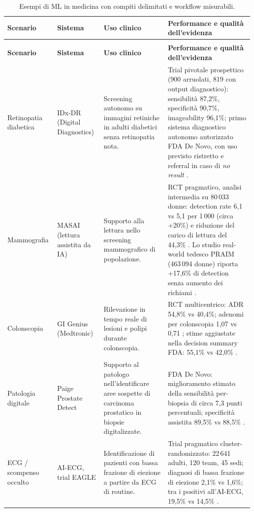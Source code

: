 \documentclass[11pt,a4paper]{article}
\begin{document}
\begin{longtable}{>{\RaggedRight}p{2.1cm} >{\RaggedRight}p{2.4cm} >{\RaggedRight}p{4.0cm} >{\RaggedRight}p{5.3cm}}
\caption{Esempi di ML in medicina con compiti delimitati e workflow misurabili.}
\label{tab:medicina}\\
\toprule
\textbf{Scenario} & \textbf{Sistema} & \textbf{Uso clinico} & \textbf{Performance e qualità dell'evidenza} \\
\midrule
\endfirsthead
\multicolumn{4}{l}{\footnotesize\itshape Tabella \ref{tab:medicina} (continua)}\\
\toprule
\textbf{Scenario} & \textbf{Sistema} & \textbf{Uso clinico} & \textbf{Performance e qualità dell'evidenza} \\
\midrule
\endhead
\bottomrule
\endlastfoot
\small Retinopatia diabetica & \small IDx-DR (Digital Diagnostics) & \small Screening autonomo su immagini retiniche in adulti diabetici senza retinopatia nota. & \small Trial pivotale prospettico (900 arruolati, 819 con output diagnostico): sensibilità 87,2\%, specificità 90,7\%, imageability 96,1\%; primo sistema diagnostico autonomo autorizzato FDA De Novo, con uso previsto ristretto e referral in caso di \emph{no result} \cite{abramoff2018,fda-idx}. \\
\addlinespace
\small Mammografia & \small MASAI (lettura assistita da IA) & \small Supporto alla lettura nello screening mammografico di popolazione. & \small RCT pragmatico, analisi intermedia su 80\,033 donne: detection rate 6,1 vs 5,1 per 1\,000 (circa +20\%) e riduzione del carico di lettura del 44,3\% \cite{lang2023}. Lo studio real-world tedesco PRAIM (463\,094 donne) riporta +17,6\% di detection senza aumento dei richiami \cite{eisemann2025}. \\
\addlinespace
\small Colonscopia & \small GI Genius (Medtronic) & \small Rilevazione in tempo reale di lesioni e polipi durante colonscopia. & \small RCT multicentrico: ADR 54,8\% vs 40,4\%; adenomi per colonscopia 1,07 vs 0,71 \cite{repici2020}; stime aggiustate nella decision summary FDA: 55,1\% vs 42,0\% \cite{fda-gigenius}. \\
\addlinespace
\small Patologia digitale & \small Paige Prostate Detect & \small Supporto al patologo nell'identificare aree sospette di carcinoma prostatico in biopsie digitalizzate. & \small FDA De Novo: miglioramento stimato della sensibilità per-biopsia di circa 7,3 punti percentuali; specificità assistita 89,5\% vs 88,5\% \cite{fda-paige}. \\
\addlinespace
\small ECG / scompenso occulto & \small AI-ECG, trial EAGLE & \small Identificazione di pazienti con bassa frazione di eiezione a partire da ECG di routine. & \small Trial pragmatico cluster-randomizzato: 22\,641 adulti, 120 team, 45 sedi; diagnosi di bassa frazione di eiezione 2,1\% vs 1,6\%; tra i positivi all'AI-ECG, 19,5\% vs 14,5\% \cite{yao2021}. \\

\end{longtable}
\end{document}
